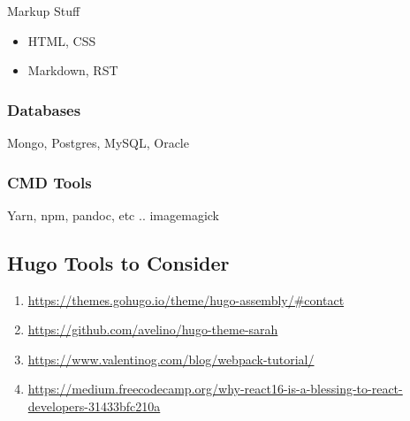 Markup Stuff

\begin{itemize}

\item
  HTML, CSS
\item
  Markdown, RST
\end{itemize}


\subsubsection{Databases}\label{databases}

Mongo, Postgres, MySQL, Oracle


\subsubsection{CMD Tools}\label{cmd-tools}

Yarn, npm, pandoc, etc .. imagemagick

\hypertarget{hugo-tools-to-consider}{%
\subsection{Hugo Tools to Consider}\label{hugo-tools-to-consider}}

\begin{enumerate}
\def\labelenumi{\arabic{enumi}.}

\item
  \url{https://themes.gohugo.io/theme/hugo-assembly/\#contact}
\item
  \url{https://github.com/avelino/hugo-theme-sarah}
\item
  \url{https://www.valentinog.com/blog/webpack-tutorial/}
\item
  \url{https://medium.freecodecamp.org/why-react16-is-a-blessing-to-react-developers-31433bfc210a}
\end{enumerate}
